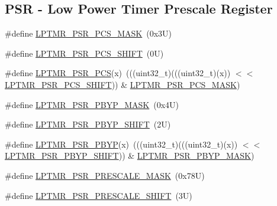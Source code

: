 \subsection*{P\+SR -\/ Low Power Timer Prescale Register}
\begin{DoxyCompactItemize}
\item 
\#define \mbox{\hyperlink{group___l_p_t_m_r___register___masks_ga40daa10db43ec0c0a1944e6289ca29cc}{L\+P\+T\+M\+R\+\_\+\+P\+S\+R\+\_\+\+P\+C\+S\+\_\+\+M\+A\+SK}}~(0x3\+U)
\item 
\#define \mbox{\hyperlink{group___l_p_t_m_r___register___masks_gaf258bce874ad60601d6d76cefc72c52e}{L\+P\+T\+M\+R\+\_\+\+P\+S\+R\+\_\+\+P\+C\+S\+\_\+\+S\+H\+I\+FT}}~(0\+U)
\item 
\#define \mbox{\hyperlink{group___l_p_t_m_r___register___masks_gabeba0b705770f53c56a569a5ee74536b}{L\+P\+T\+M\+R\+\_\+\+P\+S\+R\+\_\+\+P\+CS}}(x)~(((uint32\+\_\+t)(((uint32\+\_\+t)(x)) $<$$<$ \mbox{\hyperlink{group___l_p_t_m_r___register___masks_gaf258bce874ad60601d6d76cefc72c52e}{L\+P\+T\+M\+R\+\_\+\+P\+S\+R\+\_\+\+P\+C\+S\+\_\+\+S\+H\+I\+FT}})) \& \mbox{\hyperlink{group___l_p_t_m_r___register___masks_ga40daa10db43ec0c0a1944e6289ca29cc}{L\+P\+T\+M\+R\+\_\+\+P\+S\+R\+\_\+\+P\+C\+S\+\_\+\+M\+A\+SK}})
\item 
\#define \mbox{\hyperlink{group___l_p_t_m_r___register___masks_gab3daae6085cf702b31db5be78fe03872}{L\+P\+T\+M\+R\+\_\+\+P\+S\+R\+\_\+\+P\+B\+Y\+P\+\_\+\+M\+A\+SK}}~(0x4\+U)
\item 
\#define \mbox{\hyperlink{group___l_p_t_m_r___register___masks_ga4bb5021e396db697f5e597fdcdc222e3}{L\+P\+T\+M\+R\+\_\+\+P\+S\+R\+\_\+\+P\+B\+Y\+P\+\_\+\+S\+H\+I\+FT}}~(2\+U)
\item 
\#define \mbox{\hyperlink{group___l_p_t_m_r___register___masks_ga3d7c49e91df0f310a5dcf2effef9ae25}{L\+P\+T\+M\+R\+\_\+\+P\+S\+R\+\_\+\+P\+B\+YP}}(x)~(((uint32\+\_\+t)(((uint32\+\_\+t)(x)) $<$$<$ \mbox{\hyperlink{group___l_p_t_m_r___register___masks_ga4bb5021e396db697f5e597fdcdc222e3}{L\+P\+T\+M\+R\+\_\+\+P\+S\+R\+\_\+\+P\+B\+Y\+P\+\_\+\+S\+H\+I\+FT}})) \& \mbox{\hyperlink{group___l_p_t_m_r___register___masks_gab3daae6085cf702b31db5be78fe03872}{L\+P\+T\+M\+R\+\_\+\+P\+S\+R\+\_\+\+P\+B\+Y\+P\+\_\+\+M\+A\+SK}})
\item 
\#define \mbox{\hyperlink{group___l_p_t_m_r___register___masks_ga93a6fe3fb169a73716a837cedb92dbef}{L\+P\+T\+M\+R\+\_\+\+P\+S\+R\+\_\+\+P\+R\+E\+S\+C\+A\+L\+E\+\_\+\+M\+A\+SK}}~(0x78\+U)
\item 
\#define \mbox{\hyperlink{group___l_p_t_m_r___register___masks_ga7ed76902e13634d0c543ade3ef47525a}{L\+P\+T\+M\+R\+\_\+\+P\+S\+R\+\_\+\+P\+R\+E\+S\+C\+A\+L\+E\+\_\+\+S\+H\+I\+FT}}~(3\+U)

\end{DoxyCompactItemize}
